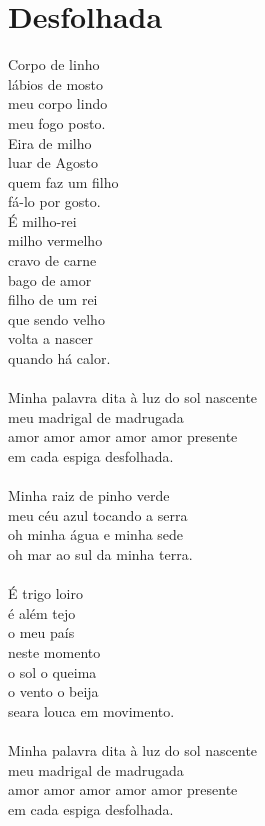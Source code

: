 \documentclass{article}
\begin{document}
\section{ Desfolhada}
Corpo de linho \\
lábios de mosto \\
meu corpo lindo \\
meu fogo posto. \\
Eira de milho \\
luar de Agosto \\
quem faz um filho \\
fá-lo por gosto. \\
É milho-rei \\
milho vermelho \\
cravo de carne \\
bago de amor \\
filho de um rei \\
que sendo velho \\
volta a nascer \\
quando há calor. \\
\\
Minha palavra dita à luz do sol nascente \\
meu madrigal de madrugada \\
amor amor amor amor amor presente \\
em cada espiga desfolhada. \\
\\
Minha raiz de pinho verde \\
meu céu azul tocando a serra \\
oh minha água e minha sede \\
oh mar ao sul da minha terra. \\
\\
É trigo loiro \\
é além tejo \\
o meu país \\
neste momento \\
o sol o queima \\
o vento o beija \\
seara louca em movimento. \\
\\
Minha palavra dita à luz do sol nascente \\
meu madrigal de madrugada \\
amor amor amor amor amor presente \\
em cada espiga desfolhada. \\
\\
\end{document}

